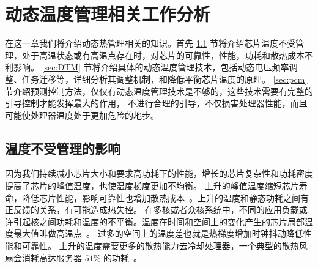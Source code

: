 
\chapter{动态温度管理相关工作分析}



在这一章我们将介绍动态热管理相关的知识。首先 \ref{sec:adverse} 节将介绍芯片温度不受管理，处于高温状态或有高温点存在时，对芯片的可靠性，性能，功耗和散热成本不利影响。
 \ref{sec:DTM} 节将介绍具体的动态温度管理技术，包括动态电压频率调整、任务迁移等，详细分析其调整机制，和降低平衡芯片温度的原理。
 \ref{sec:pcm} 节介绍预测控制方法，仅仅有动态温度管理技术是不够的，这些技术需要有完整的引导控制才能发挥最大的作用，
 不进行合理的引导，不仅损害处理器性能，而且可能使处理器温度处于更加危险的地步。



\section{温度不受管理的影响}\label{sec:adverse}

因为我们持续减小芯片大小和要求高功耗下的性能，增长的芯片复杂性和功耗密度提高了芯片的峰值温度，也使温度梯度更加不均衡。
上升的峰值温度缩短芯片寿命，降低芯片性能，影响可靠性也增加散热成本~\cite{skadron:TACO'04}。上升的温度和静态功耗之间有正反馈的关系，有可能造成热失控。
在多核或者众核系统中，不同的应用负载或许引起核之间功耗和温度的不平衡。温度在时间和空间上的变化产生的芯片局部温度最大值叫做高温点~\cite{Donald:ISCA'06}。
过多的空间上的温度差也就是热梯度增加时钟抖动降低性能和可靠性。
上升的温度需要更多的散热能力去冷却处理器，一个典型的散热风扇会消耗高达服务器 $51\%$ 的功耗~\cite{lefurgy2003energy,ayoub2010gentlecool}。

